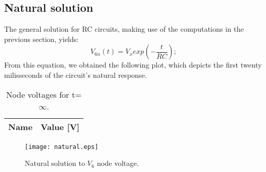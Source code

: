 \subsection{Natural solution}
The general solution for RC circuits, making use of the computations in the previous section, yields:
\begin{equation}
V_{6n}(t)=V_xexp(-\frac{t}{RC});
\end{equation}
From this equation, we obtained the following plot, which depicts the first twenty milisseconds of the circuit's natural response.

\begin{table}[h]
  \centering
  \begin{tabular}{|l|r|}
    \hline    
    {\bf Name} & {\bf Value [V]} \\ \hline
     
  \end{tabular}
  \caption{Node voltages for t=$\infty$.}
  \label{tab:nule}
\end{table}

\begin{figure}[h] \centering
\texttt{[image: natural.eps]}
\caption{Natural solution to $V_{6}$ node voltage.}
\label{fig:current}
\end{figure}

